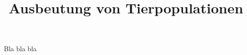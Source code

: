 \documentclass[11pt,a4paper]{article}
\title{Ausbeutung von Tierpopulationen}
\begin{document}
	\maketitle
	
	Bla bla bla
\end{document}
